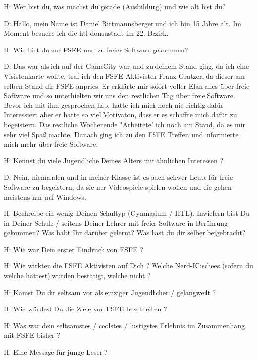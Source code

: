 H: Wer bist du, was machst du gerade (Ausbildung) und wie alt bist du?


D: Hallo, mein Name ist Daniel Rittmannsberger und ich bin 15 Jahre alt. Im Moment besuche ich die htl donaustadt im 22. Bezirk.





H: Wie bist du zur FSFE und zu freier Software gekommen?


D: Das war als ich auf der GameCity war und zu deinem Stand ging, da ich eine Visistenkarte wollte, traf ich den FSFE-Aktivisten
   Franz Gratzer, da dieser am selben Stand die FSFE anpries. Er erklärte mir sofort voller Elan alles über freie Software und so
   unterhielten wir uns den restlichen Tag über freie Software. Bevor ich mit ihm gesprochen hab, hatte ich mich noch nie
   richtig dafür Interessiert aber er hatte so viel Motivaton, dass er es schaffte mich dafür zu begeistern. Das restliche
   Wochenende "Arbeitete" ich noch am Stand, da es mir sehr viel Spaß machte. Danach ging ich zu den FSFE Treffen und
   informierte mich mehr über freie Software.





H: Kennst du viele Jugendliche Deines Alters mit ähnlichen Interessen ?


D: Nein, niemanden und in meiner Klasse ist es auch schwer Leute für freie Software zu begeistern, da sie nur Videospiele
   spielen wollen und die gehen meistens nur auf Windows.





H: Bechreibe ein wenig Deinen Schultyp (Gymnasium / HTL). Inwiefern bist Du in Deiner Schule / seitens Deiner Lehrer 
   mit freier Software in Berührung gekommen? Was habt Ihr darüber gelernt? Was hast du dir selber beigebracht?


H: Wie war Dein erster Eindruck von FSFE ?



H: Wie wirkten die FSFE Aktivisten auf Dich ? Welche Nerd-Klischees (sofern du welche hattest) wurden bestätigt, 
   welche nicht ?


H: Kamst Du dir seltsam vor als einziger Jugendlicher / gelangweilt ?


H: Wie würdest Du die Ziele von FSFE beschreiben ?


H: Was war dein seltsamstes / coolstes / lustigstes Erlebnis im Zusammenhang mit FSFE bisher ?


H: Eine Message für junge Leser ?

